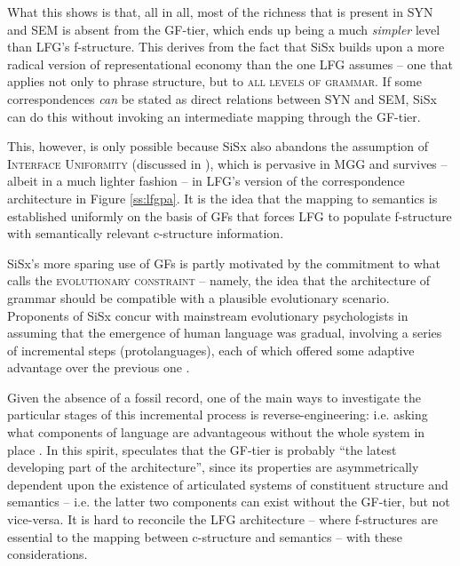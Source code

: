 \documentclass[output=paper,hidelinks]{langscibook}
\begin{document}
What this shows is that, all in all, most of the richness that is present in SYN and SEM is absent from the GF-tier, which ends up being a much \textit{simpler} level than LFG's f-structure. This derives from the fact that SiSx builds upon a more radical version of representational economy than the one LFG assumes -- one that applies not only to phrase structure, but to \textsc{all levels of grammar}. If some correspondences \textit{can} be stated as direct relations between SYN and SEM, SiSx can do this without invoking an intermediate mapping through the GF-tier.

This, however, is only possible because SiSx also abandons the assumption of \textsc{Interface Uniformity} (discussed in ), which is pervasive in MGG and survives -- albeit in a much lighter fashion -- in LFG's version of the correspondence architecture in Figure \ref{ss:lfgpa}. It is the idea that the mapping to semantics is established uniformly on the basis of GFs that forces LFG to populate f-structure with semantically relevant c-structure information.

SiSx's more sparing use of GFs is partly motivated by the commitment to what \citet{jackendoff2011alternative} calls the \textsc{evolutionary constraint} -- namely, the idea that the architecture of grammar should be compatible with a plausible evolutionary scenario. Proponents of SiSx concur with mainstream evolutionary psychologists in assuming that the emergence of human language was gradual, involving a series of incremental steps (protolanguages), each of which offered some adaptive advantage over the previous one \citep{pinker1990natural, corballis2017evolution, dennett2017bacteria, fitch2017empirical, boeckx2017not, martins2019language, de2020evolutionary}. 


Given the absence of a fossil record, one of the main ways to investigate the particular stages of this incremental process is reverse-engineering: i.e. asking what components of language are advantageous without the whole system in place \citep{jackendoff1999possible, jackendoff2005nature, progovac2016gradualist}. In this spirit, \citet[261]{jackendoff2002foundations} speculates that the GF-tier is probably ``the latest developing part of the architecture'', since its properties are asymmetrically dependent upon the existence of articulated systems of constituent structure and semantics -- i.e. the latter two components can exist without the GF-tier, but not vice-versa. It is hard to reconcile the LFG architecture -- where f-structures are essential to the mapping between c-structure and semantics -- with these considerations.
\end{document}
